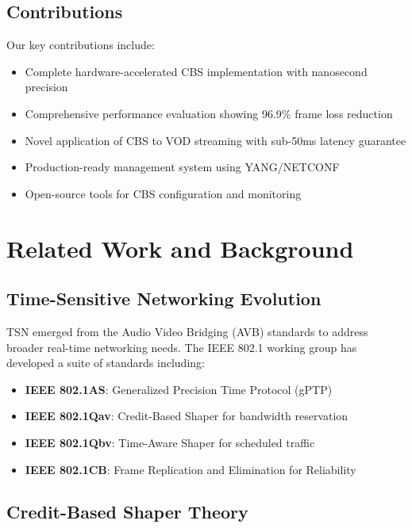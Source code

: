 \documentclass[10pt, journal, compsoc]{IEEEtran}
\begin{document}
\subsection{Contributions}

Our key contributions include:

\begin{itemize}
    \item Complete hardware-accelerated CBS implementation with nanosecond precision
    \item Comprehensive performance evaluation showing 96.9\% frame loss reduction
    \item Novel application of CBS to VOD streaming with sub-50ms latency guarantee
    \item Production-ready management system using YANG/NETCONF
    \item Open-source tools for CBS configuration and monitoring
\end{itemize}

\section{Related Work and Background}

\subsection{Time-Sensitive Networking Evolution}

TSN emerged from the Audio Video Bridging (AVB) standards to address broader real-time networking needs. The IEEE 802.1 working group has developed a suite of standards including:

\begin{itemize}
    \item \textbf{IEEE 802.1AS}: Generalized Precision Time Protocol (gPTP) \cite{ieee8021as}
    \item \textbf{IEEE 802.1Qav}: Credit-Based Shaper for bandwidth reservation
    \item \textbf{IEEE 802.1Qbv}: Time-Aware Shaper for scheduled traffic \cite{ieee8021qbv}
    \item \textbf{IEEE 802.1CB}: Frame Replication and Elimination for Reliability \cite{ieee8021cb}
\end{itemize}

\subsection{Credit-Based Shaper Theory}
\end{document}
